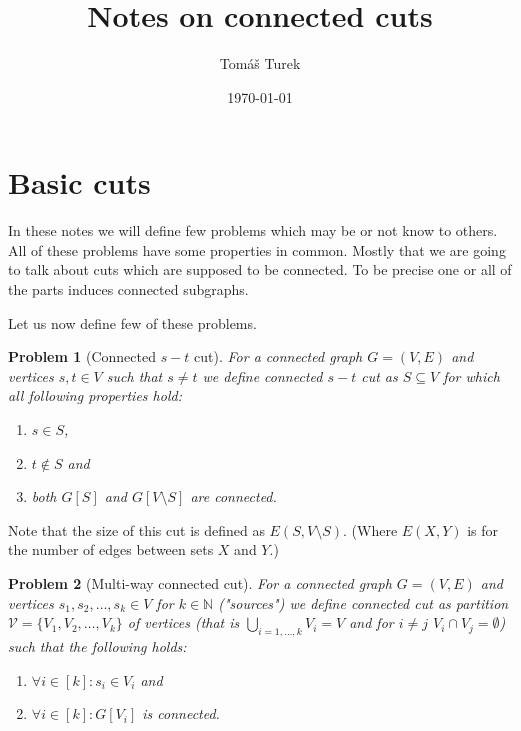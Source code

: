 \documentclass{article}
\title{Notes on connected cuts}
\author{Tomáš Turek}
\date{\today}
\theoremstyle{plain}
\theoremstyle{plain}
\newtheorem{problem}{Problem}
\theoremstyle{remark}
\begin{document}
	\maketitle
	
	
	\tableofcontents
	
	
	\section{Basic cuts}
	
	In these notes we will define few problems which may be or not know to others. All of these problems have some properties in common. Mostly that we are going to talk about cuts which are supposed to be connected. To be precise one or all of the parts induces connected subgraphs.
	
	Let us now define few of these problems.
	
	\begin{problem}[Connected $s-t$ cut]
		For a connected graph $G = (V,E)$ and vertices $s,t \in V$ such that $s\neq t$ we define \textit{connected $s-t$ cut} as $S \subseteq V$ for which all following properties hold:
		
		\begin{enumerate}
			\item $s \in S$,
			\item $t \notin S$ and
			\item both $G[S]$ and $G[V \setminus S]$ are connected.
		\end{enumerate}
	\end{problem}
	
	Note that the size of this cut is defined as $E(S, V \setminus S)$. (Where $E(X,Y)$ is for the number of edges between sets $X$ and $Y$.)
	
	\begin{problem}[Multi-way connected cut]
		For a connected graph $G = (V,E)$ and vertices $s_1, s_2, \dots, s_k \in V$ for $k \in \mathbb{N}$ ("sources") we define connected cut as partition $\mathcal{V} = \{V_1, V_2, \dots, V_k\}$ of vertices (that is $\bigcup_{i = 1, \dots, k} V_i = V$ and for $i \neq j$ $V_i \cap V_j = \emptyset$) such that the following holds:
		
		\begin{enumerate}
			\item $\forall i \in [k]: s_i \in V_i$ and
			\item $\forall i \in [k]: G[V_i]$ is connected.
		\end{enumerate}
	\end{problem}
	
\end{document}
